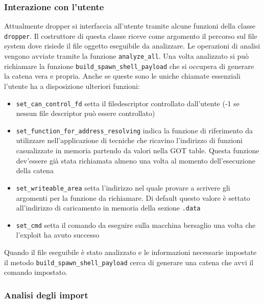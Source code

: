 \subsubsection{Interazione con l'utente}

Attualmente dropper si interfaccia all'utente tramite alcune funzioni
della classe \lstinline{dropper}. Il costruttore di questa classe
riceve come argomento il percorso sul file system dove risiede il file
oggetto eseguibile da analizzare. Le operazioni di analisi vengono
avviate tramite la funzione \lstinline{analyze_all}. Una volta
analizzato si può richiamare la funzione
\lstinline{build_spawn_shell_payload} che si occupera di generare la
catena vera e propria. Anche se queste sono le uniche chiamate
essenziali l'utente ha a disposizione ulteriori funzioni:
\begin{itemize}

\item \lstinline{set_can_control_fd} setta il filedescriptor
  controllato dall'utente (-1 se nessun file descriptor può essere
  controllato)

\item \lstinline{set_function_for_address_resolving} indica la
  funzione di riferimento da utilizzare nell'applicazione di tecniche
  che ricavino l'indirizzo di funzioni casualizzate in memoria
  partendo da valori nella GOT table. Questa funzione dev'essere già
  stata richiamata almeno una volta al momento dell'esecuzione della
  catena

\item \lstinline{set_writeable_area} setta l'indirizzo nel quale
  provare a scrivere gli argomenti per la funzione da richiamare. Di
  default questo valore è settato all'indirizzo di caricamento in
  memoria della sezione \lstinline{.data}

\item \lstinline{set_cmd} setta il comando da eseguire sulla macchina
  bersaglio una volta che l'exploit ha avuto successo

\end{itemize}

Quando il file eseguibile è stato analizzato e le informazioni
necessarie impostate il metodo \lstinline{build_spawn_shell_payload}
cerca di generare una catena che avvi il comando impostato.

\subsubsection{Analisi degli import}

